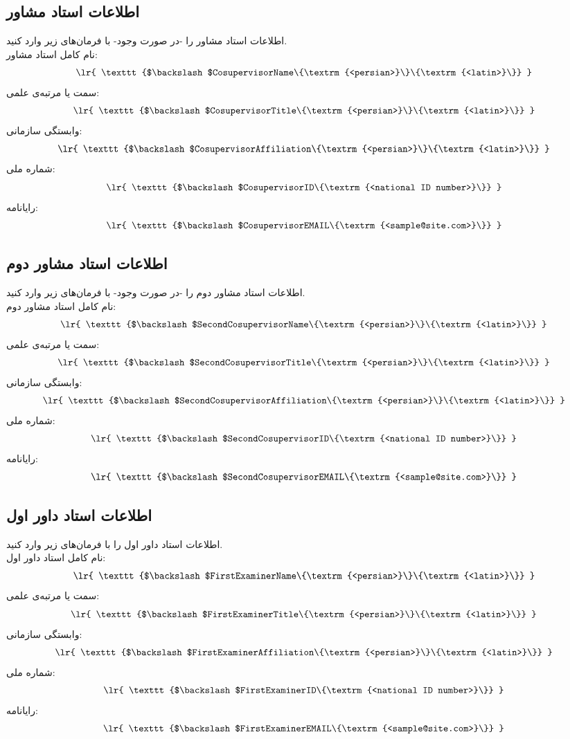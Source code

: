 \documentclass[12pt,a4paper,twoside,fleqn,notitlepage,openany]{extarticle}
\begin{document}
\subsection{اطلاعات استاد مشاور}
اطلاعات استاد مشاور را -در صورت وجود- با فرمان‌های زیر وارد کنید\@. \\
نام کامل استاد مشاور:
\[ \textrm{ \lr{ \texttt{$\backslash$CosupervisorName\{\textrm{<persian>}\}\{\textrm{<latin>}\}} } } \]
سمت یا مرتبه‌ی علمی:
\[ \textrm{ \lr{ \texttt{$\backslash$CosupervisorTitle\{\textrm{<persian>}\}\{\textrm{<latin>}\}} } } \]
وابستگی سازمانی:
\[ \textrm{ \lr{ \texttt{$\backslash$CosupervisorAffiliation\{\textrm{<persian>}\}\{\textrm{<latin>}\}} } } \]
شماره ملی:
\[ \textrm{ \lr{ \texttt{$\backslash$CosupervisorID\{\textrm{<national ID number>}\}} } } \]
رایانامه:
\[ \textrm{ \lr{ \texttt{$\backslash$CosupervisorEMAIL\{\textrm{<sample@site.com>}\}} } } \]
\subsection{اطلاعات استاد مشاور دوم}
اطلاعات استاد مشاور دوم را -در صورت وجود- با فرمان‌های زیر وارد کنید\@. \\
نام کامل استاد مشاور دوم:
\[ \textrm{ \lr{ \texttt{$\backslash$SecondCosupervisorName\{\textrm{<persian>}\}\{\textrm{<latin>}\}} } } \]
سمت یا مرتبه‌ی علمی:
\[ \textrm{ \lr{ \texttt{$\backslash$SecondCosupervisorTitle\{\textrm{<persian>}\}\{\textrm{<latin>}\}} } } \]
وابستگی سازمانی:
\[ \textrm{ \lr{ \texttt{$\backslash$SecondCosupervisorAffiliation\{\textrm{<persian>}\}\{\textrm{<latin>}\}} } } \]
شماره ملی:
\[ \textrm{ \lr{ \texttt{$\backslash$SecondCosupervisorID\{\textrm{<national ID number>}\}} } } \]
رایانامه:
\[ \textrm{ \lr{ \texttt{$\backslash$SecondCosupervisorEMAIL\{\textrm{<sample@site.com>}\}} } } \]
\subsection{اطلاعات استاد داور اول}
اطلاعات استاد داور اول را با فرمان‌های زیر وارد کنید\@. \\
نام کامل استاد داور اول:
\[ \textrm{ \lr{ \texttt{$\backslash$FirstExaminerName\{\textrm{<persian>}\}\{\textrm{<latin>}\}} } } \]
سمت یا مرتبه‌ی علمی:
\[ \textrm{ \lr{ \texttt{$\backslash$FirstExaminerTitle\{\textrm{<persian>}\}\{\textrm{<latin>}\}} } } \]
وابستگی سازمانی:
\[ \textrm{ \lr{ \texttt{$\backslash$FirstExaminerAffiliation\{\textrm{<persian>}\}\{\textrm{<latin>}\}} } } \]
شماره ملی:
\[ \textrm{ \lr{ \texttt{$\backslash$FirstExaminerID\{\textrm{<national ID number>}\}} } } \]
رایانامه:
\[ \textrm{ \lr{ \texttt{$\backslash$FirstExaminerEMAIL\{\textrm{<sample@site.com>}\}} } } \]
\end{document}
